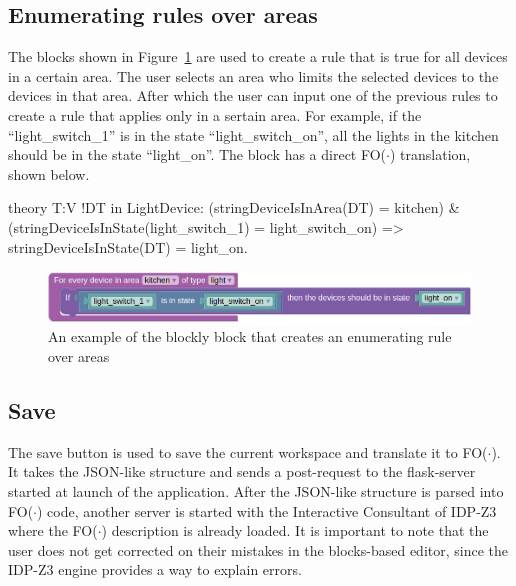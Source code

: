 \documentclass[11pt,a4paper]{report}
\newcommand{\fodot}{FO($\cdot$)\xspace}
\begin{document}
\subsection{Enumerating rules over areas}
The blocks shown in Figure~\ref{fig:homy_enumerate_rule_area} are used to create a rule that is true for all devices in a certain area. The user selects an area who limits the selected devices to the devices in that area. After which the user can input one of the previous rules to create a rule that applies only in a sertain area. For example, if the ``light\_switch\_1'' is in the state ``light\_switch\_on'', all the lights in the kitchen should be in the state ``light\_on''. The block has a direct \fodot translation, shown below.

\begin{idplisting}
theory T:V {
    !DT in LightDevice: (stringDeviceIsInArea(DT) = kitchen) & (stringDeviceIsInState(light_switch_1) = light_switch_on) => stringDeviceIsInState(DT) = light_on.
}
\end{idplisting}

\begin{figure}
    \centering
    \includegraphics[width=0.8\linewidth]{images/homy_enumerate_rule_area.png}
    \caption{An example of the blockly block that creates an enumerating rule over areas}
    \label{fig:homy_enumerate_rule_area}
\end{figure}

\subsection{Save}
The save button is used to save the current workspace and translate it to \fodot. It takes the JSON-like structure and sends a post-request to the flask-server started at launch of the application. After the JSON-like structure is parsed into \fodot code, another server is started with the Interactive Consultant of IDP-Z3 where the \fodot description is already loaded. It is important to note that the user does not get corrected on their mistakes in the blocks-based editor, since the IDP-Z3 engine provides a way to explain errors.
\end{document}
